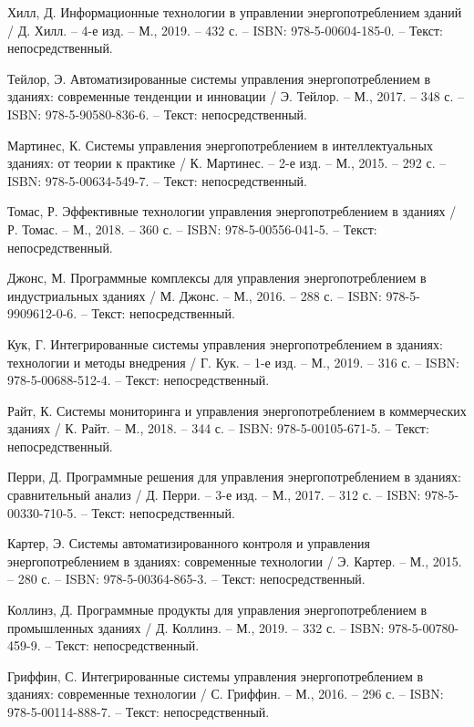 \begin{thebibliography}{50}
	 Хилл, Д. Информационные технологии в управлении энергопотреблением зданий / Д. Хилл. – 4-е изд. – М., 2019. – 432 с. – ISBN: 978-5-00604-185-0. – Текст: непосредственный.
	
	 Тейлор, Э. Автоматизированные системы управления энергопотреблением в зданиях: современные тенденции и инновации / Э. Тейлор. – М., 2017. – 348 с. – ISBN: 978-5-90580-836-6. – Текст: непосредственный.
	
	 Мартинес, К. Системы управления энергопотреблением в интеллектуальных зданиях: от теории к практике / К. Мартинес. – 2-е изд. – М., 2015. – 292 с. – ISBN: 978-5-00634-549-7. – Текст: непосредственный.
	
	 Томас, Р. Эффективные технологии управления энергопотреблением в зданиях / Р. Томас. – М., 2018. – 360 с. – ISBN: 978-5-00556-041-5. – Текст: непосредственный.


 Джонс, М. Программные комплексы для управления энергопотреблением в индустриальных зданиях / М. Джонс. – М., 2016. – 288 с. – ISBN: 978-5-9909612-0-6. – Текст: непосредственный.

 Кук, Г. Интегрированные системы управления энергопотреблением в зданиях: технологии и методы внедрения / Г. Кук. – 1-е изд. – М., 2019. – 316 с. – ISBN: 978-5-00688-512-4. – Текст: непосредственный.

 Райт, К. Системы мониторинга и управления энергопотреблением в коммерческих зданиях / К. Райт. – М., 2018. – 344 с. – ISBN: 978-5-00105-671-5. – Текст: непосредственный.

 Перри, Д. Программные решения для управления энергопотреблением в зданиях: сравнительный анализ / Д. Перри. – 3-е изд. – М., 2017. – 312 с. – ISBN: 978-5-00330-710-5. – Текст: непосредственный.

 Картер, Э. Системы автоматизированного контроля и управления энергопотреблением в зданиях: современные технологии / Э. Картер. – М., 2015. – 280 с. – ISBN: 978-5-00364-865-3. – Текст: непосредственный.

 Коллинз, Д. Программные продукты для управления энергопотреблением в промышленных зданиях / Д. Коллинз. – М., 2019. – 332 с. – ISBN: 978-5-00780-459-9. – Текст: непосредственный.

 Гриффин, С. Интегрированные системы управления энергопотреблением в зданиях: современные технологии / С. Гриффин. – М., 2016. – 296 с. – ISBN: 978-5-00114-888-7. – Текст: непосредственный.


\end{thebibliography}
